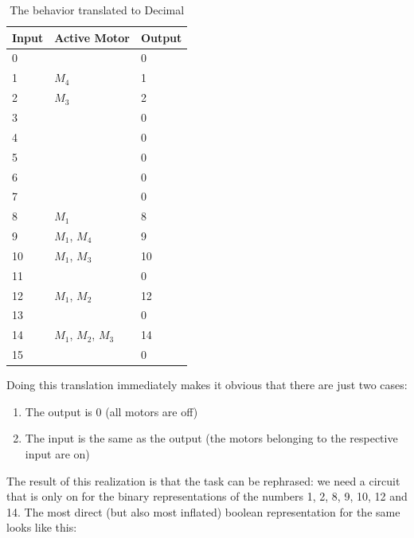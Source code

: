 \documentclass[14pt]{article}
\begin{document}
\begin{table}[H]
  \centering
  \begin{tabular}{lll}
  Input                       & Active Motor        & Output \\ 
  \hline
  0                           &                     & 0      \\
  1                           & $M_4$               & 1      \\
  2                           & $M_3$               & 2      \\
  3                           &                     & 0      \\
  4                           &                     & 0      \\
  5                           &                     & 0      \\
  6                           &                     & 0      \\
  7                           &                     & 0      \\
  8                           & $M_1$               & 8      \\
  9                           & $M_1$, $M_4$        & 9      \\
  10                          & $M_1$, $M_3$        & 10     \\
  11                          &                     & 0      \\
  12                          & $M_1$, $M_2$        & 12     \\
  13                          &                     & 0      \\
  14                          & $M_1$, $M_2$, $M_3$ & 14     \\
  15                          &                     & 0     
  \end{tabular}
  \caption{\label{table:decimal} The behavior translated to Decimal}
\end{table}

Doing this translation immediately makes it obvious that there are just two cases:
\begin{enumerate}
  \item The output is 0 (all motors are off)
  \item The input is the same as the output (the motors belonging to the respective input are on) 
\end{enumerate}

The result of this realization is that the task can be rephrased: we need a circuit that is only on for the binary representations of the
numbers 1, 2, 8, 9, 10, 12 and 14. The most direct (but also most inflated) boolean representation for the same looks like this:
\end{document}
